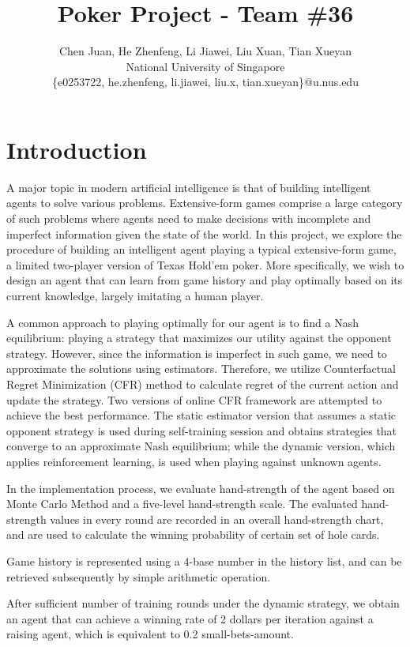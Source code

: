 \documentclass{article}
\title{Poker Project - Team \#36}
\author{
Chen Juan, He Zhenfeng, Li Jiawei, Liu Xuan, Tian Xueyan
\\ 
National University of Singapore\\
%
{\{e0253722, he.zhenfeng, li.jiawei, liu.x, tian.xueyan\}}@u.nus.edu\\
}
\begin{document}
\maketitle

\section{Introduction}
A major topic in modern artificial intelligence is that of building intelligent agents to solve various problems. Extensive-form games comprise a large category of such problems where agents need to make decisions with incomplete and imperfect information given the state of the world. In this project, we explore the procedure of building an intelligent agent playing a typical extensive-form game, a limited two-player version of Texas Hold'em poker. More specifically, we wish to design an agent that can learn from game history and play optimally based on its current knowledge, largely imitating a human player.

A common approach to playing optimally for our agent is to find a Nash equilibrium: playing a strategy that maximizes our utility against the opponent strategy. However, since the information is imperfect in such game, we need to approximate the solutions using estimators. Therefore, we utilize Counterfactual Regret Minimization (CFR) method to calculate regret of the current action and update the strategy. Two versions of online CFR framework are attempted to achieve the best performance. The static estimator version that assumes a static opponent strategy is used during self-training session and obtains strategies that converge to an approximate Nash equilibrium; while the dynamic version, which applies reinforcement learning, is used when playing against unknown agents.

In the implementation process, we evaluate hand-strength of the agent based on Monte Carlo Method and a five-level hand-strength scale. The evaluated hand-strength values in every round are recorded in an overall hand-strength chart, and are used to calculate the winning probability of certain set of hole cards. 

Game history is represented using a 4-base number in the history list, and can be retrieved subsequently by simple arithmetic operation.

After sufficient number of training rounds under the dynamic strategy, we obtain an agent that can achieve a winning rate of 2 dollars per iteration against a raising agent, which is equivalent to 0.2 small-bets-amount.
\end{document}
